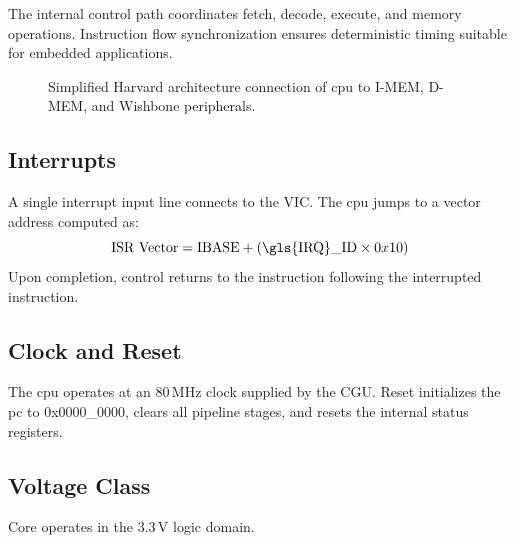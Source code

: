 The internal control path coordinates fetch, decode, execute, and memory operations.
Instruction flow synchronization ensures deterministic timing suitable for embedded applications.

\begin{figure}[H]
    \centering
    \caption{Simplified \gls{Harvard} architecture connection of \gls{cpu} to \gls{I-MEM}, \gls{D-MEM}, and Wishbone peripherals.}
    \label{fig:cpu_harvard_arch}
\end{figure}

\subsection{Interrupts}
A single interrupt input line connects to the VIC.  
The \gls{cpu} jumps to a vector address computed as:
\[
\text{ISR Vector} = \text{IBASE} + (\text{\gls{IRQ}\_ID} \times 0x10)
\]
Upon completion, control returns to the instruction following the interrupted instruction.

\subsection{Clock and Reset}
The \gls{cpu} operates at an 80\,MHz clock supplied by the CGU.  
Reset initializes the \gls{pc} to 0x0000\_0000, clears all \gls{pipeline} stages, and resets the internal status registers.

\subsection{Voltage Class}
Core operates in the 3.3\,V logic domain.

